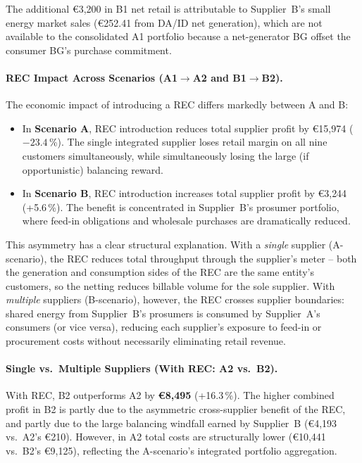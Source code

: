 The additional €3{,}200 in B1 net retail is attributable to Supplier~B's small
energy market sales (€252.41 from DA/ID net generation), which are not available
to the consolidated A1 portfolio because a net-generator BG offset the consumer
BG's purchase commitment.

\paragraph{REC Impact Across Scenarios (A1$\to$A2 and B1$\to$B2).}
The economic impact of introducing a REC differs markedly between A and B:
\begin{itemize}
    \item In \textbf{Scenario A}, REC introduction reduces total supplier profit
          by €15{,}974 ($-23.4$\,\%).  The single integrated supplier loses
          retail margin on all nine customers simultaneously, while simultaneously
          losing the large (if opportunistic) balancing reward.

    \item In \textbf{Scenario B}, REC introduction increases total supplier profit
          by €3{,}244 (+5.6\,\%).  The benefit is concentrated in Supplier~B's
          prosumer portfolio, where feed-in obligations and wholesale purchases
          are dramatically reduced.
\end{itemize}

This asymmetry has a clear structural explanation.  With a \emph{single} supplier
(A-scenario), the REC reduces total throughput through the supplier's meter --
both the generation and consumption sides of the REC are the same entity's
customers, so the netting reduces billable volume for the sole supplier.  With
\emph{multiple} suppliers (B-scenario), however, the REC crosses supplier
boundaries: shared energy from Supplier~B's prosumers is consumed by
Supplier~A's consumers (or vice versa), reducing each supplier's exposure to
feed-in or procurement costs without necessarily eliminating retail revenue.

\paragraph{Single vs.\ Multiple Suppliers (With REC: A2 vs.\ B2).}

With REC, B2 outperforms A2 by \textbf{€8{,}495} (+16.3\,\%).  The higher
combined profit in B2 is partly due to the asymmetric cross-supplier benefit of
the REC, and partly due to the large balancing windfall earned by Supplier~B
(€4{,}193 vs.\ A2's €210).  However, in A2 total costs are structurally lower
(€10{,}441 vs.\ B2's €9{,}125), reflecting the A-scenario's integrated portfolio
aggregation.

